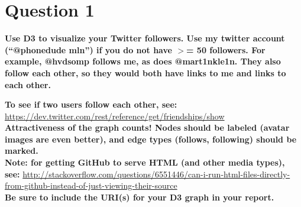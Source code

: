\chapter{Question 1}
\label{intro}

\textbf{Use D3 to visualize your Twitter followers.  Use my twitter account (``@phonedude \textunderscore mln'') if you do not have $>$= 50 followers.  For example, @hvdsomp follows me, as does @mart1nkle1n.  They also follow each other, so they would both have links to me and links to each other.}

\textbf{To see if two users follow each other, see: }
\url{https://dev.twitter.com/rest/reference/get/friendships/show}\\
\textbf{Attractiveness of the graph counts!  Nodes should be labeled (avatar images are even better), and edge types (follows, following) should be marked.}\\
\textbf{Note: for getting GitHub to serve HTML (and other media types), see:}
\url{http://stackoverflow.com/questions/6551446/can-i-run-html-files-directly-from-github-instead-of-just-viewing-their-source}\\
\textbf{Be sure to include the URI(s) for your D3 graph in your report. }

